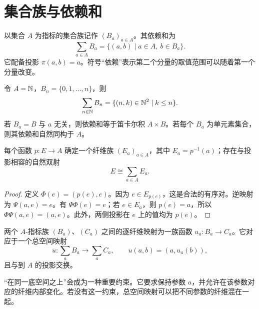 \section{集合族与依赖和}
\begin{definition}[集合族]
以集合 $A$ 为指标的集合族记作 $(B_a)_{a\in A}$。其依赖和为
\[
\sum_{a\in A}B_a=\{(a,b)\mid a\in A,\ b\in B_a\}.
\]
它配备投影 $\pi(a,b)=a$。符号“依赖”表示第二个分量的取值范围可以随着第一个分量改变。
\end{definition}
\begin{example}
令 $A=\mathbb N$，$B_n=\{0,1,\ldots,n\}$，则
\[
\sum_{n\in\mathbb N} B_n=\{(n,k)\in\mathbb N^2\mid k\le n\}.
\]
若 $B_a=B$ 与 $a$ 无关，则依赖和等于笛卡尔积 $A\times B$。若每个 $B_a$ 为单元素集合，则其依赖和自然同构于 $A$。
\end{example}
\begin{proposition}[映射与纤维族]
每个函数 $p:E\to A$ 确定一个纤维族 $(E_a)_{a\in A}$，其中 $E_a=p^{-1}(a)$；存在与投影相容的自然双射
\[
E\cong\sum_{a\in A} E_a.
\]
\end{proposition}
\begin{proof}
定义 $\Phi(e)=(p(e),e)$。因为 $e\in E_{p(e)}$，这是合法的有序对。逆映射为 $\Psi(a,e)=e$。有 $\Psi\Phi(e)=e$；若 $e\in E_a$，则 $p(e)=a$，所以 $\Phi\Psi(a,e)=(a,e)$。此外，两侧投影在 $e$ 上的值均为 $p(e)$。
\end{proof}
\begin{definition}[族之间的映射]
两个 $A$-指标族 $(B_a)$、$(C_a)$ 之间的逐纤维映射为一族函数 $u_a:B_a\to C_a$。它对应于一个总空间映射
\[
u:\sum_a B_a\longrightarrow\sum_a C_a,
\qquad u(a,b)=(a,u_a(b)),
\]
且与到 $A$ 的投影交换。
\end{definition}
\begin{remark}
“在同一底空间之上”会成为一种重要约束。它要求保持参数 $a$，并允许在该参数对应的纤维内部变化。若没有这一约束，总空间映射可以把不同参数的纤维混在一起。
\end{remark}

